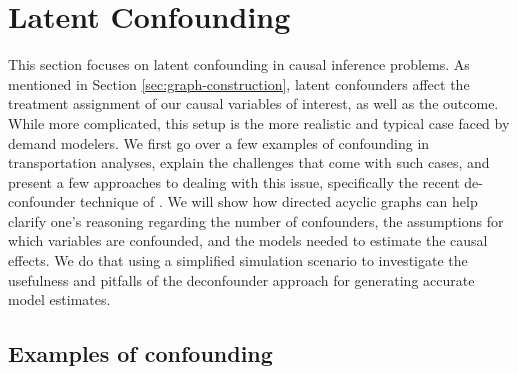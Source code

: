 \section{Latent Confounding}
\label{sec:latent-confounding}

This section focuses on latent confounding in causal inference problems.
As mentioned in Section \ref{sec:graph-construction},  latent confounders affect the treatment assignment of our causal variables of interest, as well as the outcome.
While more complicated, this setup is the more realistic and typical case faced by demand modelers.
We first go over a few examples of confounding in transportation analyses, explain
the challenges that come with such cases, and present a few approaches to
dealing with this issue, specifically the recent de-confounder technique of
\citet{wang_2019_blessings}.
We will show how directed acyclic graphs can
help clarify one's reasoning regarding the number of
confounders, the assumptions for which variables are confounded, and the models
needed to estimate the causal effects.
We do that using a simplified simulation scenario to investigate the usefulness
and pitfalls of the deconfounder approach for generating accurate model estimates.


\subsection{Examples of confounding}
\label{sec:confounding-examples}

